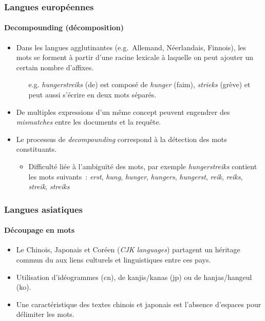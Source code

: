 \documentclass[12pt,aspectratio=43,dvipsnames,table]{beamer}
\begin{document}
\begin{frame}[shrink=5]
    \frametitle{Langues européennes}
    \framesubtitle{Decompounding (décomposition)}
    \begin{itemize} \itemsep10pt
        \item Dans les langues agglutinantes (e.g.~Allemand, Néerlandais, 
              Finnois), les mots se forment à partir d'une racine lexicale à 
              laquelle on peut ajouter un certain nombre d'affixes.
        \begin{itemize}
            \item[e.g.] \textit{hungerstreiks} (de) est composé de 
                  \textit{hunger} (faim), \textit{strieks} (grève) et peut aussi
                  s'écrire en deux mots séparés.
        \end{itemize}
        \item De multiples expressions d'un même concept peuvent engendrer des 
              \textit{mismatches} entre les documents et la requête.
        \item Le processus de \textit{decompounding} correspond à la détection 
              des mots constituants.
        \begin{itemize}
            \item Difficulté liée à l'ambiguïté des mots, par exemple 
                  \textit{hungerstreiks} contient les mots suivants~: 
                  \textit{erst}, \textit{hung}, \textit{hunger}, 
                  \textit{hungers}, \textit{hungerst}, \textit{reik}, 
                  \textit{reiks}, \textit{streik}, \textit{streiks}
        \end{itemize} 
    \end{itemize}
\end{frame}


\begin{frame}
    \frametitle{Langues asiatiques}
    \framesubtitle{Découpage en mots}
    \begin{itemize} \itemsep10pt
        \item Le Chinois, Japonais et Coréen (\textit{CJK languages}) partagent 
              un héritage commun du aux liens culturels et linguistiques entre 
              ces pays.
        \item Utilisation d'idéogrammes (cn), de kanjis/kanas (jp) ou de 
              hanjas/hangeul (ko).
        \item Une caractéristique des textes chinois et japonais est l'absence 
              d'espaces pour délimiter les mots.
    \end{itemize}
\end{frame}
\end{document}
